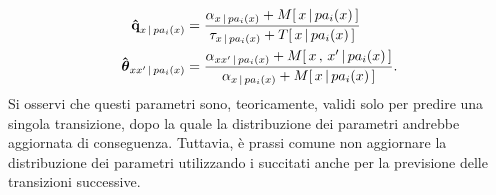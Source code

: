 \begin{equation}
\label{eq:ctbn-imaginary-params}
\begin{split}
\paramhat{q}_{x\,\arrowvert\,pa_i(\setel{x})}&=\frac{\alpha_{\setel{x}\,\arrowvert\,pa_i(\setel{x})} + \mstat{x\,\arrowvert\,pa_i(\setel{x})}}{\tau_{\setel{x}\,\arrowvert\,pa_i(\setel{x})} + \tstat{x\,\arrowvert\,pa_i(\setel{x})}} \\
\greekhat{\theta}_{xx^\prime\,\arrowvert\,pa_i(\setel{x})}&=\frac{\alpha_{\setel{x}\setel{x}^{\prime}\,\arrowvert\,pa_i(\setel{x})}+\mstat[x]{x^\prime\,\arrowvert\,pa_i(\setel{x})}}{\alpha_{\setel{x}\,\arrowvert\,pa_i(\setel{x})} + \mstat{x\,\arrowvert\,pa_i(\setel{x})}}\text{.}
\end{split}
\end{equation}
Si osservi che questi parametri sono, teoricamente, validi solo per predire una singola transizione, dopo la quale la distribuzione dei parametri andrebbe aggiornata di conseguenza. Tuttavia, è prassi comune non aggiornare la distribuzione dei parametri utilizzando i succitati \emph{} anche per la previsione delle transizioni successive.
